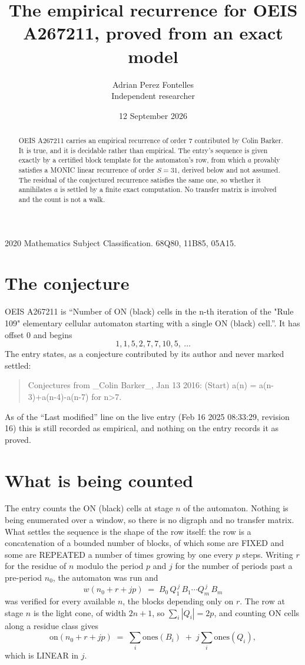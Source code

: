 \documentclass[11pt,a4paper]{article}
\title{The empirical recurrence for OEIS A267211, proved from an exact model}
\author{Adrian Perez Fontelles\\ \small Independent researcher}
\date{12 September 2026}
\theoremstyle{plain}
\theoremstyle{definition}
\begin{document}
\maketitle

\begin{abstract}
OEIS A267211 carries an empirical recurrence of order $7$ contributed by Colin Barker. It is true, and it is
decidable rather than empirical. The entry's sequence is given exactly by a certified block template for the automaton's row, from
which $a$ provably satisfies a MONIC linear recurrence of order $S=31$, derived below and not
assumed. The residual of the conjectured recurrence satisfies the same one, so whether it
annihilates $a$ is settled by a finite exact computation. No transfer matrix is involved and
the count is not a walk.
\end{abstract}

\noindent\small 2020 Mathematics Subject Classification. 68Q80, 11B85, 05A15.\normalsize

\section{The conjecture}

OEIS A267211 is ``Number of ON (black) cells in the n-th iteration of the "Rule 109" elementary cellular automaton starting with a single ON (black) cell.''. It has offset $0$ and begins
\[
1, 1, 5, 2, 7, 7, 10, 5,\ \dots
\]
The entry states, as a conjecture contributed by its author and never marked settled:
\begin{quote}
Conjectures from \_Colin Barker\_, Jan 13 2016: (Start) a(n) = a(n-3)+a(n-4)-a(n-7) for n>7.
\end{quote}
As of the ``Last modified'' line on the live entry (Feb 16 2025 08:33:29, revision 16)
this is still recorded as empirical, and nothing on the entry records it as proved.

\section{What is being counted}

The entry counts the ON (black) cells at stage $n$ of the automaton. Nothing is being enumerated over a window, so there is
no digraph and no transfer matrix. What settles the sequence is the shape of the row itself:
the row is a concatenation of a bounded number of blocks, of which some are
FIXED and some are REPEATED a number of times growing by one every $p$ steps. Writing $r$ for
the residue of $n$ modulo the period $p$ and $j$ for the number of periods past a pre-period
$n_0$, the automaton was run and
\[
w(n_0 + r + jp)\;=\;B_0\,Q_1^{\,j}\,B_1\cdots Q_m^{\,j}\,B_m
\]
was verified for every available $n$, the blocks depending only on $r$. The
row at stage $n$ is the light cone, of width $2n+1$, so $\sum_i|Q_i|=2p$, and counting ON
cells along a residue class gives
\[
\mathrm{on}(n_0+r+jp)\;=\;\sum_i \mathrm{ones}(B_i)\;+\;j\sum_i \mathrm{ones}(Q_i),
\]
which is LINEAR in $j$.
\end{document}
